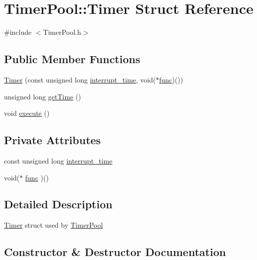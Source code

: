 \hypertarget{struct_timer_pool_1_1_timer}{}\section{Timer\+Pool\+:\+:Timer Struct Reference}
\label{struct_timer_pool_1_1_timer}


{\ttfamily \#include $<$Timer\+Pool.\+h$>$}

\subsection*{Public Member Functions}
\begin{DoxyCompactItemize}
\item 
\hyperlink{struct_timer_pool_1_1_timer_a0d5a0dc2523eef9bf1a28a9ff1b9cc8f}{Timer} (const unsigned long \hyperlink{struct_timer_pool_1_1_timer_a65c0f3c6fba122f53a7debf9d337eb81}{interrupt\+\_\+time}, void($\ast$\hyperlink{struct_timer_pool_1_1_timer_ac6b965c4aaf19b503c90fa4a4aaecf33}{func})())
\item 
unsigned long \hyperlink{struct_timer_pool_1_1_timer_a05ef787e6585b0ef7123bb804223706d}{get\+Time} ()
\item 
void \hyperlink{struct_timer_pool_1_1_timer_a797fa28dcf35d00e9081ecb368323343}{execute} ()
\end{DoxyCompactItemize}
\subsection*{Private Attributes}
\begin{DoxyCompactItemize}
\item 
const unsigned long \hyperlink{struct_timer_pool_1_1_timer_a65c0f3c6fba122f53a7debf9d337eb81}{interrupt\+\_\+time}
\item 
void($\ast$ \hyperlink{struct_timer_pool_1_1_timer_ac6b965c4aaf19b503c90fa4a4aaecf33}{func} )()
\end{DoxyCompactItemize}


\subsection{Detailed Description}
\hyperlink{struct_timer_pool_1_1_timer}{Timer} struct used by \hyperlink{class_timer_pool}{Timer\+Pool} 

\subsection{Constructor \& Destructor Documentation}
\mbox{\label{struct_timer_pool_1_1_timer_a0d5a0dc2523eef9bf1a28a9ff1b9cc8f}} 
